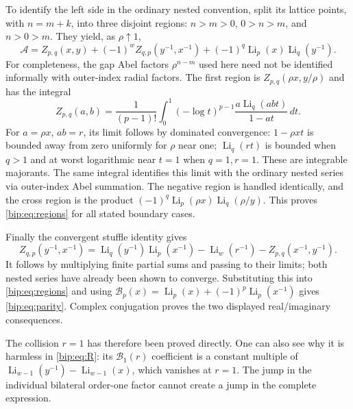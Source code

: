 \documentclass[11pt,a4paper]{article}
\numberwithin{equation}{section}
\theoremstyle{definition}
\theoremstyle{remark}
\DeclareMathOperator{\Li}{Li}
\begin{document}
To identify the left side in the ordinary nested convention, split
its lattice points, with $n=m+k$, into three disjoint regions:
$n>m>0$, $0>n>m$, and $n>0>m$. They yield, as $\rho\uparrow1$,
\begin{equation}
 \mathcal A=Z_{p,q}(x,y)+(-1)^wZ_{q,p}(y^{-1},x^{-1})
            +(-1)^q\Li_p(x)\Li_q(y^{-1}).
 \label{bip:eq:regions}
\end{equation}
For completeness, the gap Abel factors $\rho^{n-m}$ used here need
not be identified informally with outer-index radial factors.  The
first region is $Z_{p,q}(\rho x,y/\rho)$ and has the integral
\begin{equation}
 Z_{p,q}(a,b)=\frac1{(p-1)!}
    \int_0^1(-\log t)^{p-1}
            \frac{a\Li_q(abt)}{1-at}\,dt.
 \label{bip:eq:integral}
\end{equation}
For $a=\rho x$, $ab=r$, its limit follows by dominated convergence:
$1-\rho xt$ is bounded away from zero uniformly for $\rho$ near one;
$\Li_q(rt)$ is bounded when $q>1$ and at worst logarithmic near
$t=1$ when $q=1,r=1$.  These are integrable majorants.  The same
integral identifies this limit with the ordinary nested series via
outer-index Abel summation.  The negative region is handled
identically, and the cross region is the product
$(-1)^q\Li_p(\rho x)\Li_q(\rho/y)$.  This proves
\eqref{bip:eq:regions} for all stated boundary cases.

Finally the convergent stuffle identity gives
\[
 Z_{q,p}(y^{-1},x^{-1})=
 \Li_q(y^{-1})\Li_p(x^{-1})-\Li_w(r^{-1})
 -Z_{p,q}(x^{-1},y^{-1}).
\]
It follows by multiplying finite partial sums and passing to their
limits; both nested series have already been shown to converge.
Substituting this into \eqref{bip:eq:regions} and using
$\mathcal B_p(x)=\Li_p(x)+(-1)^p\Li_p(x^{-1})$ gives
\eqref{bip:eq:parity}.  Complex conjugation proves the two displayed
real/imaginary consequences.

The collision $r=1$ has therefore been proved directly. One can also
see why it is harmless in \eqref{bip:eq:R}: its $\mathcal B_1(r)$
coefficient is a constant multiple of
$\Li_{w-1}(y^{-1})-\Li_{w-1}(x)$, which vanishes at $r=1$.
The jump in the individual bilateral order-one factor cannot create
a jump in the complete expression.
\end{document}
